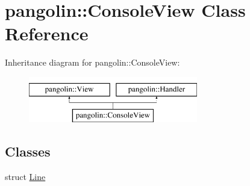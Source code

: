 \hypertarget{classpangolin_1_1_console_view}{}\section{pangolin\+:\+:Console\+View Class Reference}
\label{classpangolin_1_1_console_view}
Inheritance diagram for pangolin\+:\+:Console\+View\+:\begin{figure}[H]
\begin{center}
\leavevmode
\includegraphics[height=2.000000cm]{classpangolin_1_1_console_view}
\end{center}
\end{figure}
\subsection*{Classes}
\begin{DoxyCompactItemize}
\item 
struct \hyperlink{structpangolin_1_1_console_view_1_1_line}{Line}
\end{DoxyCompactItemize}
